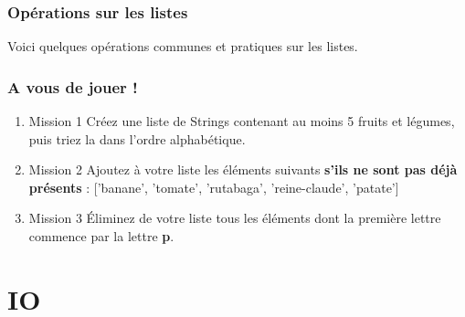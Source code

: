 \documentclass[handout]{beamer}
\begin{document}
\begin{frame}
\frametitle{Opérations sur les listes}
Voici quelques opérations communes et pratiques sur les listes.
\vspace{0.5cm}
\listOp
\end{frame}

\begin{frame}
\frametitle{A vous de jouer !}
    \begin{enumerate}
        \item \begin{block}{Mission 1}
        Créez une liste de Strings contenant au moins 5 fruits et légumes, puis triez la dans l'ordre alphabétique.
        \end{block}
        \item \begin{block}{Mission 2}
        Ajoutez à votre liste les éléments suivants \textbf{s'ils ne sont pas déjà présents} :
        ['banane', 'tomate', 'rutabaga', 'reine-claude', 'patate']
        \end{block}
        \item \begin{block}{Mission 3}
        Éliminez de votre liste tous les éléments dont la première lettre commence par la lettre \textbf{p}.
        \end{block}
    \end{enumerate}
\end{frame}

\section{IO}
\end{document}
